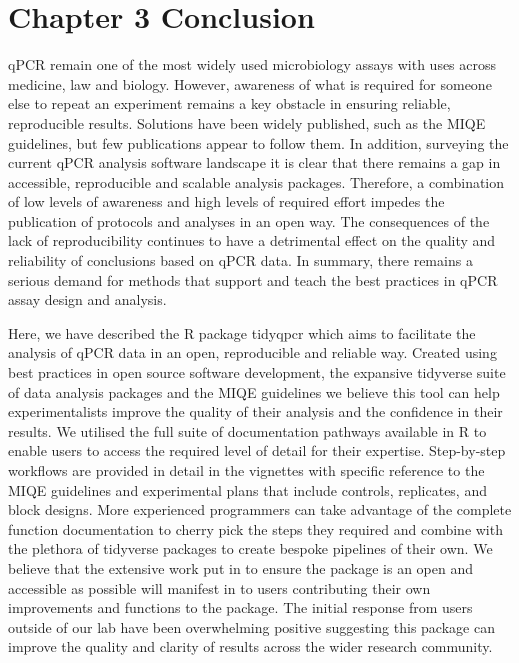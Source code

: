 \documentclass[../main.tex]{subfiles}
\begin{document}
\section{Chapter 3 Conclusion}

qPCR remain one of the most widely used microbiology assays with uses across medicine, law and biology. However, awareness of what is required for someone else to repeat an experiment remains a key obstacle in ensuring reliable, reproducible results. 
Solutions have been widely published, such as the MIQE guidelines, but few publications appear to follow them. 
In addition, surveying the current qPCR analysis software landscape it is clear that there remains a gap in accessible, reproducible and scalable analysis packages. 
Therefore, a combination of low levels of awareness and high levels of required effort impedes the publication of protocols and analyses in an open way. 
The consequences of the lack of reproducibility continues to have a detrimental effect on the quality and reliability of conclusions based on qPCR data. 
In summary, there remains a serious demand for methods that support and teach the best practices in qPCR assay design and analysis.


Here, we have described the R package tidyqpcr which aims to facilitate the analysis of qPCR data in an open, reproducible and reliable way. 
Created using best practices in open source software development, the expansive tidyverse suite of data analysis packages and the MIQE guidelines we believe this tool can help experimentalists improve the quality of their analysis and the confidence in their results.
We utilised the full suite of documentation pathways available in R to enable users to access the required level of detail for their expertise. 
Step-by-step workflows are provided in detail in the vignettes with specific reference to the MIQE guidelines and experimental plans that include controls, replicates, and block designs. 
More experienced programmers can take advantage of the complete function documentation to cherry pick the steps they required and combine with the plethora of tidyverse packages to create bespoke pipelines of their own.
We believe that the extensive work put in to ensure the package is an open and accessible as possible will manifest in to users contributing their own improvements and functions to the package. 
The initial response from users outside of our lab have been overwhelming positive suggesting this package can improve the quality and clarity of results across the wider research community.
\end{document}
